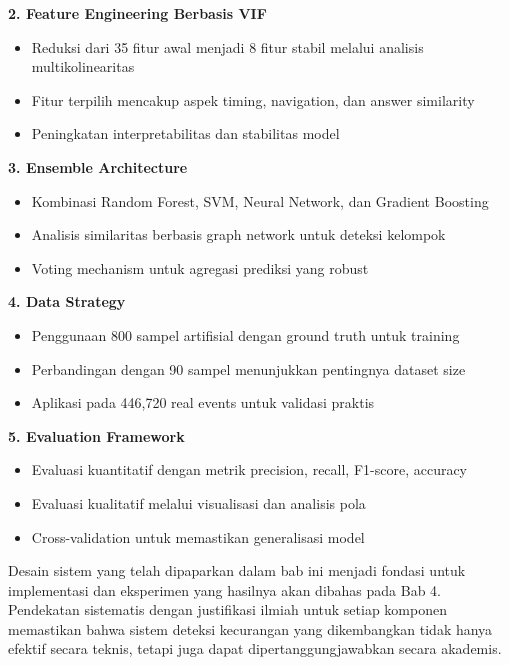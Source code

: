 \textbf{2. Feature Engineering Berbasis VIF}
\begin{itemize}
    \item Reduksi dari 35 fitur awal menjadi 8 fitur stabil melalui analisis multikolinearitas
    \item Fitur terpilih mencakup aspek timing, navigation, dan answer similarity
    \item Peningkatan interpretabilitas dan stabilitas model
\end{itemize}

\textbf{3. Ensemble Architecture}
\begin{itemize}
    \item Kombinasi Random Forest, SVM, Neural Network, dan Gradient Boosting
    \item Analisis similaritas berbasis graph network untuk deteksi kelompok
    \item Voting mechanism untuk agregasi prediksi yang robust
\end{itemize}

\textbf{4. Data Strategy}
\begin{itemize}
    \item Penggunaan 800 sampel artifisial dengan ground truth untuk training
    \item Perbandingan dengan 90 sampel menunjukkan pentingnya dataset size
    \item Aplikasi pada 446,720 real events untuk validasi praktis
\end{itemize}

\textbf{5. Evaluation Framework}
\begin{itemize}
    \item Evaluasi kuantitatif dengan metrik precision, recall, F1-score, accuracy
    \item Evaluasi kualitatif melalui visualisasi dan analisis pola
    \item Cross-validation untuk memastikan generalisasi model
\end{itemize}

Desain sistem yang telah dipaparkan dalam bab ini menjadi fondasi untuk implementasi dan eksperimen yang hasilnya akan dibahas pada Bab 4. Pendekatan sistematis dengan justifikasi ilmiah untuk setiap komponen memastikan bahwa sistem deteksi kecurangan yang dikembangkan tidak hanya efektif secara teknis, tetapi juga dapat dipertanggungjawabkan secara akademis.
